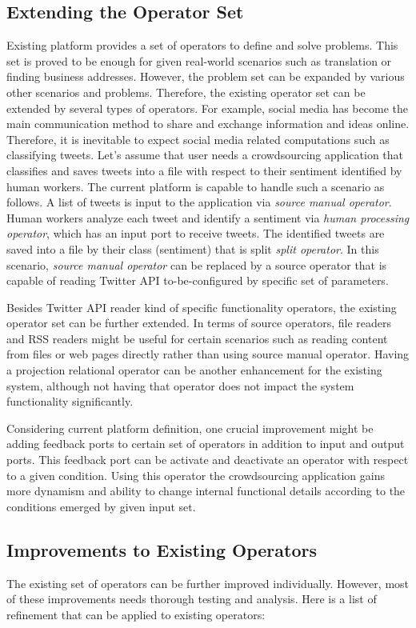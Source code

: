 \subsection{Extending the Operator Set}
Existing platform provides a set of operators to define and solve problems. This set is proved to be enough for given real-world scenarios such as translation or finding business addresses. However, the problem set can be expanded by various other scenarios and problems. Therefore, the existing operator set can be extended by several types of operators. For example, social media has become the main communication method to share and exchange information and ideas online. Therefore, it is inevitable to expect social media related computations such as classifying tweets. Let's assume that user needs a crowdsourcing application that classifies and saves tweets into a file with respect to their sentiment identified by human workers. The current platform is capable to handle such a scenario as follows. A list of tweets is input to the application via \textit{source manual operator}. Human workers analyze each tweet and identify a sentiment via \textit{human processing operator}, which has an input port to receive tweets. The identified tweets are saved into a file by their class (sentiment) that is split \textit{split operator}. In this scenario, \textit{source manual operator} can be replaced by a source operator that is capable of reading Twitter API to-be-configured by specific set of parameters.

Besides Twitter API reader kind of specific functionality operators, the existing operator set can be further extended. In terms of source operators, file readers and RSS readers might be useful for certain scenarios such as reading content from files or web pages directly rather than using source manual operator. Having a projection relational operator can be another enhancement for the existing system, although not having that operator does not impact the system functionality significantly.

Considering current platform definition, one crucial improvement might be adding feedback ports to certain set of operators in addition to input and output ports. This feedback port can be activate and deactivate an operator with respect to a given condition. Using this operator the crowdsourcing application gains more dynamism and ability to change internal functional details according to the conditions emerged by given input set.

\subsection{Improvements to Existing Operators}
The existing set of operators can be further improved individually. However, most of these improvements needs thorough testing and analysis. Here is a list of refinement that can be applied to existing operators: 

